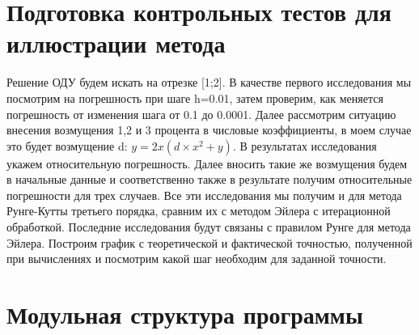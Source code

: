 \documentclass[a4paper]{article}
\begin{document}
 
\section{Подготовка контрольных тестов для иллюстрации метода} 

Решение ОДУ будем искать на отрезке [1;2]. В качестве первого исследования мы посмотрим на погрешность при шаге h=0.01, затем проверим, как меняется погрешность от изменения шага от 0.1 до 0.0001. Далее рассмотрим ситуацию внесения возмущения 1,2 и 3 процента в числовые коэффициенты, в моем случае это будет возмущение d: 
$y = 2x(d \times x^2+y)$. В результатах исследования укажем относительную погрешность. Далее вносить такие же возмущения будем в начальные данные и соответственно также в результате получим относительные погрешности для трех случаев. Все эти исследования мы получим и для метода Рунге-Кутты третьего порядка, сравним их с методом Эйлера с итерационной обработкой. Последние исследования будут связаны с правилом Рунге для метода Эйлера. Построим график с теоретической и фактической точностью, полученной при вычислениях и посмотрим какой шаг необходим для заданной точности. \\

\newpage
\section{Модульная структура программы} 
 
\end{document}
